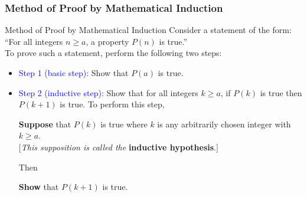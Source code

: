 \documentclass{beamer}
\begin{document}
\begin{frame}%
\frametitle{Method of Proof by Mathematical Induction}
\footnotesize

\begin{block}{Method of Proof by Mathematical Induction}
Consider a statement of the form:\\
\hspace{1cm} ``For all integers $n \ge a$, a property $P(n)$ is true.''\\
\vspace{0.1cm}
To prove such a statement, perform the following two steps:\\
\begin{itemize}

\item<1-> \textcolor{blue}{Step 1 (basic step):} Show that $P(a)$ is true.\\
\vspace{0.2cm}
\item<1-> \textcolor{blue}{Step 2 (inductive step):} Show that for all integers $k \ge a$, if $P(k)$ is true then
$P(k+1)$ is true. To perform this step,\\
\vspace{0.2cm}
\begin{center}
\textbf{Suppose} that $P(k)$ is true where $k$ is any arbitrarily chosen integer with $k \ge a$.\\
\scriptsize
$[$\emph{This supposition is called the} \textbf{inductive hypothesis}.$]$
\normalsize
\end{center}
\vspace{0.2cm}
Then
\begin{center}
\textbf{Show} that $P(k + 1)$ is true.
\end{center}

\end{itemize}
\end{block}

\end{frame}
\end{document}
